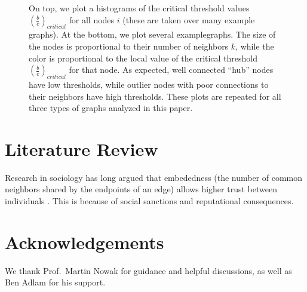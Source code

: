 \documentclass{article}
\renewcommand{\=}[1]{\stackrel{#1}{=}} %
\begin{document}
\begin{figure}
\noindent{}
\noindent{}
\caption{
On top, we plot a histograms of the critical threshold values $\left(\frac{b}{c}\right)_{critical}$ for all nodes $i$ (these are taken over many example graphs). At the bottom, we plot several examplegraphs. The size of the nodes is proportional to their number of neighbors $k$, while the color is proportional to the local value of the critical threshold $\left(\frac{b}{c}\right)_{critical}$ for that node. As expected, well connected ``hub'' nodes have low thresholds, while outlier nodes with poor connections to their neighbors have high thresholds. These plots are repeated for all three types of graphs analyzed in this paper.}

\label{fig:local_thresholds}
\end{figure}

\section{Literature Review}
Research in sociology has long argued that embededness (the number of common neighbors shared by the endpoints of an edge) allows higher trust between individuals \cite{easley2010networks}. This is because of social sanctions and reputational consequences.

\section{Acknowledgements}


    We thank Prof.~Martin Nowak for guidance and helpful discussions, as
well as Ben Adlam for his support.



                

    
    
    
    
\end{document}
